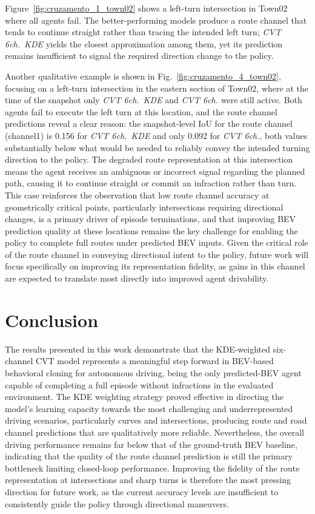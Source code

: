 \documentclass[12pt]{article}
\begin{document}
Figure~\ref{fig:cruzamento_1_town02} shows a left-turn intersection in Town02 where all agents fail. The better-performing models produce a route channel that tends to continue straight rather than tracing the intended left turn; \textit{CVT 6ch.\ KDE} yields the closest approximation among them, yet its prediction remains insufficient to signal the required direction change to the policy.

Another qualitative example is shown in Fig.~\ref{fig:cruzamento_4_town02}, focusing on a left-turn intersection in the eastern section of Town02, where at the time of the snapshot only \textit{CVT 6ch.\ KDE} and \textit{CVT 6ch.} were still active. Both agents fail to execute the left turn at this location, and the route channel predictions reveal a clear reason: the snapshot-level IoU for the route channel (channel1) is 0.156 for \textit{CVT 6ch.\ KDE} and only 0.092 for \textit{CVT 6ch.}, both values substantially below what would be needed to reliably convey the intended turning direction to the policy. The degraded route representation at this intersection means the agent receives an ambiguous or incorrect signal regarding the planned path, causing it to continue straight or commit an infraction rather than turn. This case reinforces the observation that low route channel accuracy at geometrically critical points, particularly intersections requiring directional changes, is a primary driver of episode terminations, and that improving BEV prediction quality at these locations remains the key challenge for enabling the policy to complete full routes under predicted BEV inputs. Given the critical role of the route channel in conveying directional intent to the policy, future work will focus specifically on improving its representation fidelity, as gains in this channel are expected to translate most directly into improved agent drivability.



\section{Conclusion}
\label{sec:conclusion}
The results presented in this work demonstrate that the KDE-weighted six-channel CVT model represents a meaningful step forward in BEV-based behavioral cloning for autonomous driving, being the only predicted-BEV agent capable of completing a full episode without infractions in the evaluated environment. The KDE weighting strategy proved effective in directing the model's learning capacity towards the most challenging and underrepresented driving scenarios, particularly curves and intersections, producing route and road channel predictions that are qualitatively more reliable. Nevertheless, the overall driving performance remains far below that of the ground-truth BEV baseline, indicating that the quality of the route channel prediction is still the primary bottleneck limiting closed-loop performance. Improving the fidelity of the route representation at intersections and sharp turns is therefore the most pressing direction for future work, as the current accuracy levels are insufficient to consistently guide the policy through directional maneuvers.
\end{document}
